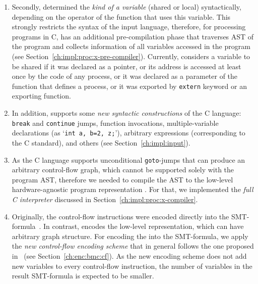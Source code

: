 \begin{enumerate}[label=\arabic*.]
\begin{enumerate}[leftmargin=\parindent,label=\alph*.]
  \item Secondly, \porthos[1] determined the \textit{kind of a variable} (shared or local) syntactically, depending on the operator of the function that uses this variable.
  This strongly restricts the syntax of the input language, therefore, for processing programs in C, \porthos[2] has an additional pre-compilation phase that traverses AST of the program and collects information of all variables accessed in the program (see Section~\ref{ch:impl:proc:x-pre-compiler}).
  Currently, \porthos[2] considers a variable to be shared if it was declared as a pointer, or its address is accessed at least once by the code of any process, or it was declared as a parameter of the function that defines a process, or it was exported by \texttt{extern} keyword or an exporting function.
  
  \item In addition, \porthos[2] supports some \textit{new syntactic constructions} of the C language: \texttt{break} and \texttt{continue} jumps, function invocations, multiple-variable declarations (as `\lstinline{int a, b=2, z;}'), arbitrary expressions (corresponding to the C standard), and others (see Section~\ref{ch:impl:input}).

  \item As the C language supports unconditional \texttt{goto}-jumps that can produce an arbitrary control-flow graph, which cannot be supported solely with the program AST, therefore we needed to compile the AST to the low-level hardware-agnostic program representation \xgraph{}.
  For that, we implemented the \textit{full C interpreter} discussed in Section~\ref{ch:impl:proc:x-compiler}.
  
  \item Originally, the control-flow instructions were encoded directly into the SMT-formula~\cite{Porthos17a}.
  In contrast, \porthos[2] encodes the low-level \xgraph{} representation, which can have arbitrary graph structure.
  For encoding the \xgraph{} into the SMT-formula, we apply the \textit{new control-flow encoding scheme} that in general follows the one proposed in~\cite[Chapter 5.1.2]{heljanko2008unfoldings} (see Section~\ref{ch:enc:bmc:cf}).
  As the new encoding scheme does not add new variables to every control-flow instruction, the number of variables in the result SMT-formula is expected to be smaller.
  

\end{enumerate}
\end{enumerate}
